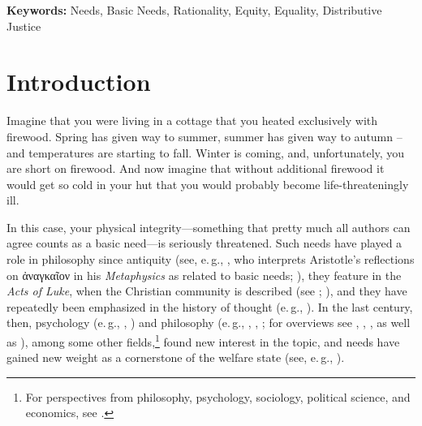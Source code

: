 \documentclass[egregdoesnotlikesansseriftitles]{scrartcl}
\begin{document}
\noindent\textbf{Keywords:} Needs, Basic Needs, Rationality, Equity, Equality, Distributive Justice


\renewcommand{\thefootnote}{\arabic{footnote}}\setcounter{footnote}{0}
\newpage


\section{Introduction}\label{sec:introduction}
Imagine that you were living in a cottage that you heated exclusively with firewood.
Spring has given way to summer, summer has given way to autumn – and temperatures are starting to fall.
Winter is coming, and, unfortunately, you are short on firewood.
And now imagine that without additional firewood it would get so cold in your hut that you would probably become life-threateningly ill.

In this case, your physical integrity---something that pretty much all authors can agree counts as a basic need---is seriously threatened.
Such needs have played a role in philosophy since antiquity (see, e.\,g., \citealt{poelzler_basic_2021}, who interprets Aristotle's reflections on \textgreek{ἀναγκαῖον} in his \textit{Metaphysics} as related to basic needs; \citealt[1015a20--1015b15]{aristotle_metaphysics_1933}), they feature in the \textit{Acts of Luke}, when the Christian community is described (see \citealt[p. 302f.]{bauer_gerechtigkeit_2019}; \citealt[p. 141f.]{luke_apostelgeschichte_2016}), and they have repeatedly been emphasized in the history of thought (e.\,g., \citealt{marx_kritik_1969}). In the last century, then, psychology (e.\,g., \citealt{maslow_theory_1943}, \citealt{alderfer_existence_1972}) and philosophy (e.\,g., \citealt{thomson_need_1987}, \citealt{miller_principles_1999}, \citealt{hamilton_political_2003}; for overviews see \citealt{brock_needs_2019}, \citealt{miller_needs_2020}, \citealt{siebel_need-based_2020}, as well as \citealt{poelzler_basic_2021}), among some other fields,\footnote{For perspectives from philosophy, psychology, sociology, political science, and economics, see \cite{kittel_need-based_2020}.} found new interest in the topic, and needs have gained new weight as a cornerstone of the welfare state (see, e.\,g., \citealt{esping-andersen_three_1990}).
\end{document}

